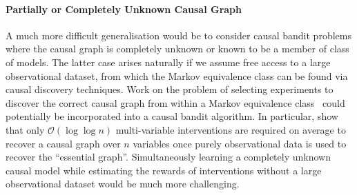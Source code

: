 \documentclass{article}
\newcommand{\bigo}[1]{\mathcal{O}\left( #1 \right)}
\theoremstyle{plain}
\theoremstyle{definition}
\begin{document}




\vspace{-0.4cm} 
\paragraph{Partially or Completely Unknown Causal Graph}
A much more difficult generalisation would be to consider causal bandit problems where the causal graph is completely unknown or known to be a member of class of models.
The latter case arises naturally if we assume free access to a large observational dataset, from which the Markov equivalence class can be found via causal discovery techniques. 
Work on the problem of selecting experiments to discover the correct causal graph from within a Markov equivalence class~\cite{Eberhardt2005,eberhardt2010causal,hauser2014two,Hu2014b} could potentially be incorporated into a causal bandit algorithm.
In particular, \citet{Hu2014b} show that only $\bigo{\log \log n}$ multi-variable interventions are required on average to recover a causal graph over $n$ variables once purely observational data is used to recover the ``essential graph''.
Simultaneously learning a completely unknown causal model while estimating the rewards of interventions without a large observational dataset would be much more challenging.
\end{document}
